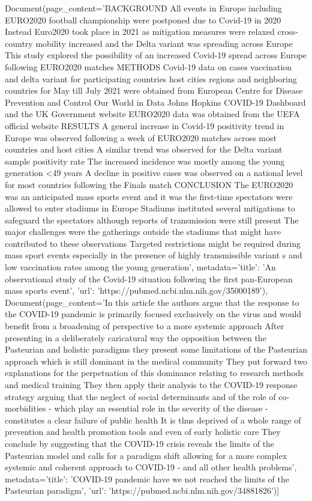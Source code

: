 Document(page\_content='BACKGROUND All events in Europe including EURO2020 football championship were postponed due to Covid-19 in 2020 Instead Euro2020 took place in 2021 as mitigation measures were relaxed cross-country mobility increased and the Delta variant was spreading across Europe This study explored the possibility of an increased Covid-19 spread across Europe following EURO2020 matches METHODS Covid-19 data on cases vaccination and delta variant for participating countries host cities regions and neighboring countries for May till July 2021 were obtained from European Centre for Disease Prevention and Control Our World in Data Johns Hopkins COVID-19 Dashboard and the UK Government website EURO2020 data was obtained from the UEFA official website RESULTS A general increase in Covid-19 positivity trend in Europe was observed following a week of EURO2020 matches across most countries and host cities A similar trend was observed for the Delta variant sample positivity rate The increased incidence was mostly among the young generation <49 years A decline in positive cases was observed on a national level for most countries following the Finals match CONCLUSION The EURO2020 was an anticipated mass sports event and it was the first-time spectators were allowed to enter stadiums in Europe Stadiums instituted several mitigations to safeguard the spectators although reports of transmission were still present The major challenges were the gatherings outside the stadiums that might have contributed to these observations Targeted restrictions might be required during mass sport events especially in the presence of highly transmissible variant s and low vaccination rates among the young generation', metadata={'title': 'An observational study of the Covid-19 situation following the first pan-European mass sports event', 'url': 'https://pubmed.ncbi.nlm.nih.gov/35000189'}), Document(page\_content='In this article the authors argue that the response to the COVID-19 pandemic is primarily focused exclusively on the virus and would benefit from a broadening of perspective to a more systemic approach After presenting in a deliberately caricatural way the opposition between the Pasteurian and holistic paradigms they present some limitations of the Pasteurian approach which is still dominant in the medical community They put forward two explanations for the perpetuation of this dominance relating to research methods and medical training They then apply their analysis to the COVID-19 response strategy arguing that the neglect of social determinants and of the role of co-morbidities - which play an essential role in the severity of the disease - constitutes a clear failure of public health It is thus deprived of a whole range of prevention and health promotion tools and even of early holistic care They conclude by suggesting that the COVID-19 crisis reveals the limits of the Pasteurian model and calls for a paradigm shift allowing for a more complex systemic and coherent approach to COVID-19 - and all other health problems', metadata={'title': 'COVID-19 pandemic have we not reached the limits of the Pasteurian paradigm', 'url': 'https://pubmed.ncbi.nlm.nih.gov/34881826'})]

